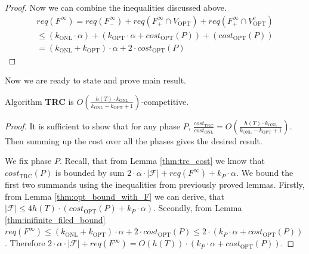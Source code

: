 \begin{proof}
Now we can combine the inequalities discussed above.
\begin{multline*}
req(F^{\infty}) = req(F^{\infty}_{-}) + 
req(F^{\infty}_{+} \cap V_{\mathrm{OPT}}) + req(F^{\infty}_{+} \cap 
V_{\mathrm{OPT}}^c) \\
\leq (k_{\mathrm{ONL}} \cdot \alpha) + (k_{\mathrm{OPT}} \cdot \alpha 
+ cost_{\mathrm{OPT}}(P)) + (cost_{\mathrm{OPT}}(P)) \\ 
= (k_{\mathrm{ONL}} + 
k_{\mathrm{OPT}}) \cdot \alpha + 2 \cdot 
cost_{\mathrm{OPT}}(P)
\end{multline*}
\end{proof}
Now we are ready to state and prove main result.
\begin{theorem}
Algorithm \textbf{TRC} is $O(\frac{h(T) \cdot k_{\mathrm{ONL}}}{k_{\mathrm{ONL}} 
- k_{\mathrm{OPT}} + 1})$-competitive.
\label{thm:main_theorem}
\end{theorem}
\begin{proof}
It is sufficient to show that for any phase $P$, 
$\frac{cost_{\mathrm{TRC}}}{cost_{\mathrm{ONL}}} = O(\frac{h(T) \cdot 
k_{\mathrm{ONL}}}{k_{\mathrm{ONL}} - k_{\mathrm{OPT}} + 1})$. Then summing up 
the cost over all the phases gives the desired result.

We fix phase $P$. Recall, that from Lemma \ref{thm:trc_cost} we know that 
$cost_{\mathrm{TRC}}(P)$ is bounded by sum $2 \cdot \alpha \cdot |\mathcal{F}| 
+ req(F^{\infty}) + k_P \cdot \alpha$. We bound the first two summands using 
the inequalities from previously proved lemmas. Firstly, from Lemma 
\ref{thm:opt_bound_with_F} we can derive, that $|\mathcal{F}| \leq 
4h(T) \cdot (cost_{\mathrm{OPT}}(P) + k_P \cdot \alpha)$. Secondly, from Lemma 
\ref{thm:inifinite_filed_bound} $req(F^{\infty}) \leq 
(k_{\mathrm{ONL}} + k_{\mathrm{OPT}}) \cdot \alpha + 2 \cdot 
cost_{\mathrm{OPT}}(P) \leq 2 \cdot (k_P \cdot \alpha + 
cost_{\mathrm{OPT}}(P))$. Therefore $2 \cdot \alpha \cdot |\mathcal{F}| + 
req(F^{\infty}) = O(h(T)) \cdot (k_P \cdot \alpha + cost_{\mathrm{OPT}}(P))$.
\end{proof}

